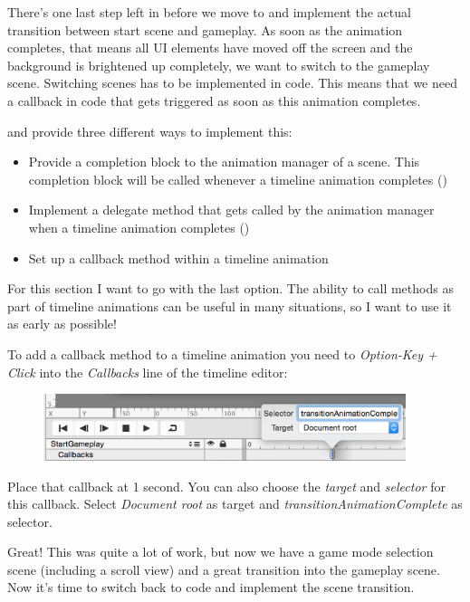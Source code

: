 There's one last step left in \SB{} before we move to \xcode{} and implement the
actual transition between start scene and gameplay. As soon as the animation
completes, that means all UI elements have moved off the screen and the
background is brightened up completely, we want to switch to the gameplay scene.
Switching scenes has to be implemented in code. This means that we need a
callback in code that gets triggered as soon as this animation completes.

\SB{} and \cocos{} provide three different ways to implement this:
\begin{itemize}
  \item Provide a completion block to the animation manager of a scene. This
  completion block will be called whenever a timeline animation completes
  ()
  \item Implement a delegate method that gets called by the animation manager
  when a timeline animation completes
  ()
  \item Set up a callback method within a \SB{} timeline animation
\end{itemize}

For this section I want to go with the last option. The ability to call methods
as part of timeline animations can be useful in many situations, so I want to
use it as early as possible!

\begin{leftbar}
To add a callback method to a timeline animation you need to \textit{Option-Key
+ Click} into the \textit{Callbacks} line of the timeline editor:

\begin{figure}[H]
		\centering
		\includegraphics[width=300pt]{images/Chapter7/timeline_callback.png}
\end{figure}
Place that callback at 1 second. You can also choose the \textit{target} and
\textit{selector} for this callback. Select \textit{Document root} as target and
\textit{transitionAnimationComplete} as selector.
\end{leftbar}

Great! This was quite a lot of work, but now we have a game mode selection
scene (including a scroll view) and a great transition into the gameplay scene.
Now it's time to switch back to code and implement the scene transition.

